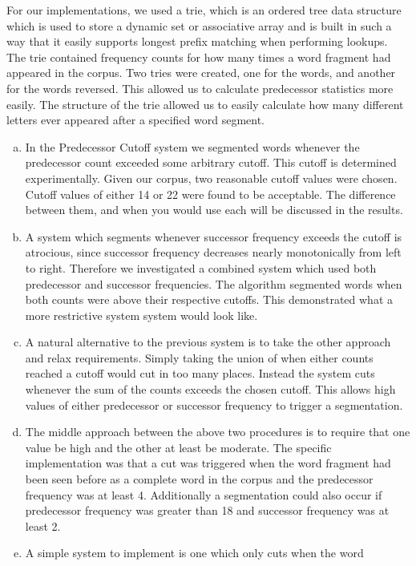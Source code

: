 \documentclass[11pt]{article}
\begin{document}
For our implementations,
we used a trie, which is an ordered tree data structure which is used to store
a dynamic set or associative array and is built in such a way that it easily
supports longest prefix matching when performing lookups.
The trie contained frequency counts for how many times a word fragment
had appeared in the corpus. Two tries were created, one for the words, and
another for the words reversed. This allowed us to calculate predecessor
statistics more easily. The structure of the trie allowed us to easily
calculate how many different letters ever appeared after a specified word
segment.
\begin{enumerate}[(a)] 
\item In the Predecessor Cutoff system we segmented words whenever the
  predecessor count exceeded some arbitrary cutoff. This cutoff is determined
  experimentally. Given our corpus, two reasonable cutoff values were chosen.
  Cutoff values of either 14 or 22 were found to be acceptable. The difference
  between them, and when you would use each will be discussed in the results.
\item A system which segments whenever successor frequency exceeds the cutoff
  is atrocious, since successor frequency decreases nearly monotonically from
  left to right. Therefore we investigated a combined system which used both
  predecessor and successor frequencies. The algorithm segmented words when
  both counts were above their respective cutoffs. This demonstrated
  what a more restrictive system system would look like.
\item A natural alternative to the previous system is to take the other
  approach and relax requirements. Simply taking the union of when either
  counts reached a cutoff would cut in too many places. Instead the system
  cuts whenever the sum of the counts exceeds the chosen cutoff. This allows
  high values of either predecessor or successor frequency to trigger a 
  segmentation.
\item The middle approach between the above two procedures is to require
  that one value be high and the other at least be moderate. The specific
  implementation was that a cut was triggered when the word fragment had been
  seen before as a complete word in the corpus and the predecessor frequency
  was at least 4. Additionally a segmentation could also occur if predecessor
  frequency was greater than 18 and successor frequency was at least 2.
\item A simple system to implement is one which only cuts when the word

\end{enumerate}
\end{document}
